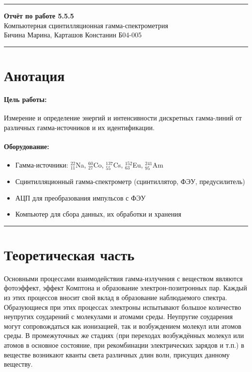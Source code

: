 \documentclass[a4paper,12pt]{article} %
\begin{document}


\hrule 	
\medskip
\begin{raggedright}
{\large \textbf{Отчёт по работе 5.5.5}}
\\
\medskip
{\Large Компьютерная сцинтилляционная гамма-спектрометрия} 
\\
\medskip
{\large Бичина Марина, Карташов Констанин Б04-005}
\medskip
\hrule
\medskip
\end{raggedright}


\section{Анотация}

\paragraph{Цель работы:} 
Измерение и определение энергий и интенсивности дискретных гамма-линий от различных гамма-источников и их идентификации.

\paragraph{Оборудование:}
\begin{itemize}
\renewcommand{\labelitemi}{$\triangleright$}
\itemsep0em
\item Гамма-источники: $^{22}_{11}$Na, $^{60}_{27}$Co, $^{137}_{55}$Cs, $^{152}_{63}$Eu, $^{241}_{95}$Am
\item Сцинтилляционный гамма-спектрометр (сцинтиллятор, ФЭУ, предусилитель)
\item АЦП для преобразования импульсов с ФЭУ
\item Компьютер для сбора данных, их обработки и хранения
\end{itemize}


\medskip\hrule\medskip

\section{Теоретическая часть}

\paragraph{}Основными процессами взаимодействия гамма-излучения с веществом являются фотоэффект, эффект Комптона и образование электрон-позитронных пар. Каждый из этих процессов вносит свой вклад в образование наблюдаемого спектра. Образующиеся при этих процессах электроны испытывают большое количество неупругих соударений с молекулами и атомами среды. Неупругие соударения могут сопровождаться как ионизацией, так и возбуждением молекул или атомов среды. В промежуточных же стадиях (при переходах возбуждённых молекул или атомов в основное состояние, при рекомбинации электрических зарядов и т.п.) в веществе возникают кванты света различных длин волн, присущих данному веществу.
	
\end{document}
